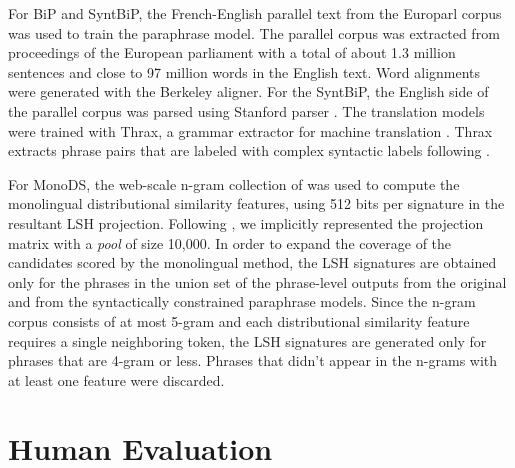 \documentclass[11pt]{article}
\begin{document}
For BiP and SyntBiP, the French-English parallel text from the Europarl corpus \cite{Koehn05} was used to train the paraphrase model. The parallel corpus was extracted from proceedings of the European parliament with a total of about 1.3 million sentences and close to 97 million words in the English text. Word alignments were generated with the Berkeley aligner. For the SyntBiP, the English side of the parallel corpus was parsed using Stanford parser \cite{KleinManning03}. 
The translation models were trained with Thrax, a grammar extractor for machine translation \cite{WeeseThrax11}. %
Thrax extracts phrase pairs that are labeled with complex syntactic labels following .

For MonoDS, the web-scale n-gram collection of  was used
to compute the monolingual distributional similarity features, using 512 bits
per signature in the resultant LSH projection. Following
, we implicitly represented the projection matrix
with a \emph{pool} of size 10,000. In order to expand the coverage of the
candidates scored by the monolingual method, the LSH signatures are obtained
only for the phrases in the union set of the phrase-level outputs from the
original and from the syntactically constrained paraphrase models. Since the
n-gram corpus consists of at most 5-gram and each distributional similarity
feature requires a single neighboring token, the LSH signatures are generated
only for phrases that are 4-gram or less. Phrases that didn't appear in the
n-grams with at least one feature were discarded.



\vspace{-.1cm}
\section{Human Evaluation}
\vspace{-.1cm}
\end{document}

